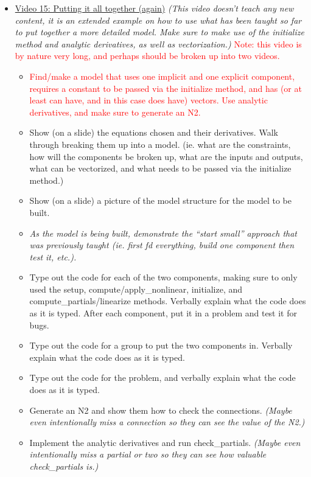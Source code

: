 \documentclass[12pt, letterpaper]{article}
\begin{document}
\begin{itemize}
	\item \underline{Video 15: Putting it all together (again)} \textit{(This video doesn’t teach any new content, it is an extended example on how to use what has been taught so far to put together a more detailed model. Make sure to make use of the initialize method and analytic derivatives, as well as vectorization.)} \textcolor{red}{Note: this video is by nature very long, and perhaps should be broken up into two videos.}
		\begin{itemize}
			\item \textcolor{red}{Find/make a model that uses one implicit and one explicit component, requires a constant to be passed via the initialize method, and has (or at least can have, and in this case does have) vectors. Use analytic derivatives, and make sure to generate an N2.}
			\item Show (on a slide) the equations chosen and their derivatives. Walk through breaking them up into a model. (ie. what are the constraints, how will the components be broken up, what are the inputs and outputs, what can be vectorized, and what needs to be passed via the initialize method.)
			\item Show (on a slide) a picture of the model structure for the model to be built.
			\item \textit{As the model is being built, demonstrate the ``start small'' approach that was previously taught (ie. first fd everything, build one component then test it, etc.).}
			\item Type out the code for each of the two components, making sure to only used the setup, compute/apply\_nonlinear, initialize, and compute\_partials/linearize methods. Verbally explain what the code does as it is typed. After each component, put it in a problem and test it for bugs.
			\item Type out the code for a group to put the two components in. Verbally explain what the code does as it is typed.
			\item Type out the code for the problem, and verbally explain what the code does as it is typed.
			\item Generate an N2 and show them how to check the connections. \textit{(Maybe even intentionally miss a connection so they can see the value of the N2.)}
			\item Implement the analytic derivatives and run check\_partials. \textit{(Maybe even intentionally miss a partial or two so they can see how valuable check\_partials is.)}

\end{itemize}
\end{itemize}
\end{document}
